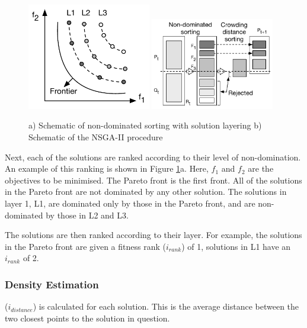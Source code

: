 \begin{figure}[t] 
	\vskip -10pt
	\centering
	\includegraphics[width=0.48\textwidth]{Chapter6/figures/carbon_optimiser/paretofrontier/paretofrontier}
	\includegraphics[width=0.480\textwidth]{Chapter6/figures/carbon_optimiser/algsketch/sketch2}
	\vskip -8pt
	\caption{a) Schematic of non-dominated sorting with solution layering b) Schematic of the NSGA-II procedure}
	\label{fig:pareto-layering}
	\vskip -15pt
\end{figure}


Next, each of the solutions are ranked according to their level of non-domination. An example of this ranking is shown in Figure \ref{fig:pareto-layering}a. Here, $f_1$ and $f_2$ are the objectives to be minimised. The Pareto front is the first front. All of the solutions in the Pareto front are not dominated by any other solution. The solutions in layer 1, L1, are dominated only by those in the Pareto front, and are non-dominated by those in L2 and L3.

The solutions are then ranked according to their layer. For example, the solutions in the Pareto front are given a fitness rank ($i_{rank}$) of 1, solutions in L1 have an $i_{rank}$ of 2.

\subsubsection{Density Estimation}
($i_{distance}$) is calculated for each solution. This is the average distance between the two closest points to the solution in question. 


